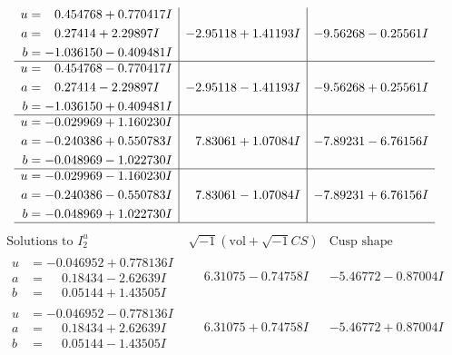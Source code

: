 \documentclass[1p]{elsarticle_modified}
\theoremstyle{definition}
\newcommand{\I}{\sqrt{-1}}
\begin{document}
$$\begin{array}{c|c|c}
\begin{aligned}
u &= \phantom{-}0.454768 + 0.770417 I \\
a &= \phantom{-}0.27414 + 2.29897 I \\
b &= -1.036150 - 0.409481 I\end{aligned}
 & -2.95118 + 1.41193 I & -9.56268 - 0.25561 I \\ \hline\begin{aligned}
u &= \phantom{-}0.454768 - 0.770417 I \\
a &= \phantom{-}0.27414 - 2.29897 I \\
b &= -1.036150 + 0.409481 I\end{aligned}
 & -2.95118 - 1.41193 I & -9.56268 + 0.25561 I \\ \hline\begin{aligned}
u &= -0.029969 + 1.160230 I \\
a &= -0.240386 + 0.550783 I \\
b &= -0.048969 - 1.022730 I\end{aligned}
 & \phantom{-}7.83061 + 1.07084 I & -7.89231 - 6.76156 I \\ \hline\begin{aligned}
u &= -0.029969 - 1.160230 I \\
a &= -0.240386 - 0.550783 I \\
b &= -0.048969 + 1.022730 I\end{aligned}
 & \phantom{-}7.83061 - 1.07084 I & -7.89231 + 6.76156 I\\
 \hline 
 \end{array}$$\newpage$$\begin{array}{c|c|c}  
\text{Solutions to }I^u_{2}& \I (\text{vol} + \sqrt{-1}CS) & \text{Cusp shape}\\
 \hline 
\begin{aligned}
u &= -0.046952 + 0.778136 I \\
a &= \phantom{-}0.18434 - 2.62639 I \\
b &= \phantom{-}0.05144 + 1.43505 I\end{aligned}
 & \phantom{-}6.31075 - 0.74758 I & -5.46772 - 0.87004 I \\ \hline\begin{aligned}
u &= -0.046952 - 0.778136 I \\
a &= \phantom{-}0.18434 + 2.62639 I \\
b &= \phantom{-}0.05144 - 1.43505 I\end{aligned}
 & \phantom{-}6.31075 + 0.74758 I & -5.46772 + 0.87004 I \\ \hline\begin{aligned}

\end{aligned}
\end{array}$$
\end{document}
